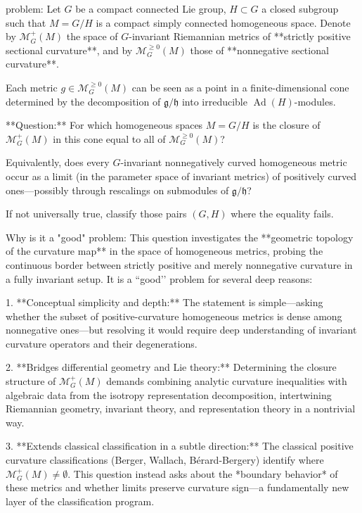 problem:  
Let \( G \) be a compact connected Lie group, \( H \subset G \) a closed subgroup such that \( M = G/H \) is a compact simply connected homogeneous space. Denote by \( \mathcal{M}_G^+(M) \) the space of \(G\)-invariant Riemannian metrics of **strictly positive sectional curvature**, and by \( \mathcal{M}_G^{\ge 0}(M) \) those of **nonnegative sectional curvature**.  

Each metric \( g \in \mathcal{M}_G^{\ge 0}(M) \) can be seen as a point in a finite-dimensional cone determined by the decomposition of \(\mathfrak{g}/\mathfrak{h}\) into irreducible \(\operatorname{Ad}(H)\)-modules.  

**Question:**  
For which homogeneous spaces \(M = G/H\) is the closure of \( \mathcal{M}_G^{+}(M) \) in this cone equal to all of \( \mathcal{M}_G^{\ge 0}(M) \)?  

Equivalently, does every \(G\)-invariant nonnegatively curved homogeneous metric occur as a limit (in the parameter space of invariant metrics) of positively curved ones—possibly through rescalings on submodules of \(\mathfrak{g}/\mathfrak{h}\)?  

If not universally true, classify those pairs \((G,H)\) where the equality fails.  

Why is it a "good" problem:  
This question investigates the **geometric topology of the curvature map** in the space of homogeneous metrics, probing the continuous border between strictly positive and merely nonnegative curvature in a fully invariant setup. It is a “good’’ problem for several deep reasons:

1. **Conceptual simplicity and depth:**  
   The statement is simple—asking whether the subset of positive-curvature homogeneous metrics is dense among nonnegative ones—but resolving it would require deep understanding of invariant curvature operators and their degenerations.

2. **Bridges differential geometry and Lie theory:**  
   Determining the closure structure of \( \mathcal{M}_G^{+}(M) \) demands combining analytic curvature inequalities with algebraic data from the isotropy representation decomposition, intertwining Riemannian geometry, invariant theory, and representation theory in a nontrivial way.

3. **Extends classical classification in a subtle direction:**  
   The classical positive curvature classifications (Berger, Wallach, Bérard-Bergery) identify where \( \mathcal{M}_G^{+}(M) \neq \emptyset \). This question instead asks about the *boundary behavior* of these metrics and whether limits preserve curvature sign—a fundamentally new layer of the classification program.

